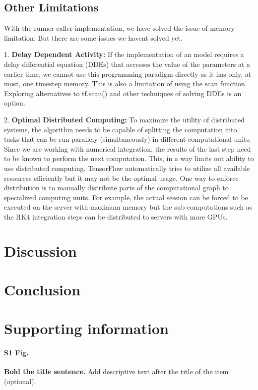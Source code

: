 \documentclass[10pt,letterpaper]{article}
\begin{document}
\subsection*{Other Limitations}

With the runner-caller implementation, we have solved the issue of memory limitation. But there are some issues we havent solved yet.

1. \textbf{Delay Dependent Activity:} If the implementation of an model requires a delay differential equation (DDEs) that accesses the value of the parameters at a earlier time, we cannot use this programming paradigm directly as it has only, at most, one timestep memory. This is also a limitation of using the scan function. Exploring alternatives to tf.scan() and other techniques of solving DDEs is an option.

2. \textbf{Optimal Distributed Computing:} To maximize the utility of distributed systems, the algorithm needs to be capable of splitting the computation into tasks that can be run parallely (simultaneously) in different computational units. Since we are working with numerical integration, the results of the last step need to be known to perform the next computation. This, in a way limits out ability to use distributed computing. TensorFlow automatically tries to utilize all available resources efficiently but it may not be the optimal usage. One way to enforce distribution is to manually distribute parts of the computational graph to specialized computing units. For example, the actual session can be forced to be executed on the server with maximum memory but the sub-computations such as the RK4 integration steps can be distributed to servers with more GPUs.

\section*{Discussion}

\section*{Conclusion}


\section*{Supporting information}

\paragraph*{S1 Fig.}
\label{S1_Fig}
{\bf Bold the title sentence.} Add descriptive text after the title of the item (optional).
\end{document}
